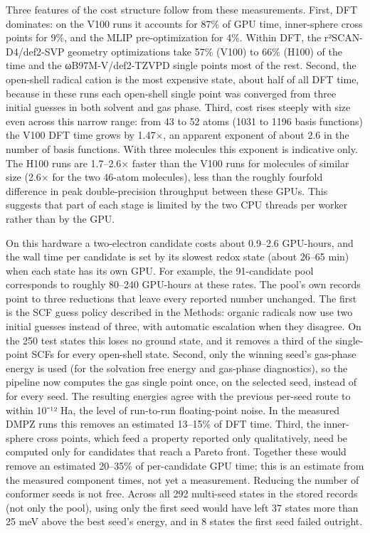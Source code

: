 \documentclass[journal=jcisd8,manuscript=article]{achemso}
\begin{document}
Three features of the cost structure follow from these measurements. First, DFT dominates: on the V100 runs it accounts for 87\% of GPU time, inner-sphere cross points for 9\%, and the MLIP pre-optimization for 4\%. Within DFT, the r²SCAN-D4/def2-SVP geometry optimizations take 57\% (V100) to 66\% (H100) of the time and the ωB97M-V/def2-TZVPD single points most of the rest. Second, the open-shell radical cation is the most expensive state, about half of all DFT time, because in these runs each open-shell single point was converged from three initial guesses in both solvent and gas phase. Third, cost rises steeply with size even across this narrow range: from 43 to 52 atoms (1031 to 1196 basis functions) the V100 DFT time grows by 1.47×, an apparent exponent of about 2.6 in the number of basis functions. With three molecules this exponent is indicative only. The H100 runs are 1.7–2.6× faster than the V100 runs for molecules of similar size (2.6× for the two 46-atom molecules), less than the roughly fourfold difference in peak double-precision throughput between these GPUs. This suggests that part of each stage is limited by the two CPU threads per worker rather than by the GPU.

On this hardware a two-electron candidate costs about 0.9–2.6 GPU-hours, and the wall time per candidate is set by its slowest redox state (about 26–65 min) when each state has its own GPU. For example, the 91-candidate pool corresponds to roughly 80–240 GPU-hours at these rates. The pool's own records point to three reductions that leave every reported number unchanged. The first is the SCF guess policy described in the Methods: organic radicals now use two initial guesses instead of three, with automatic escalation when they disagree. On the 250 test states this loses no ground state, and it removes a third of the single-point SCFs for every open-shell state. Second, only the winning seed's gas-phase energy is used (for the solvation free energy and gas-phase diagnostics), so the pipeline now computes the gas single point once, on the selected seed, instead of for every seed. The resulting energies agree with the previous per-seed route to within 10⁻¹² Ha, the level of run-to-run floating-point noise. In the measured DMPZ runs this removes an estimated 13–15\% of DFT time. Third, the inner-sphere cross points, which feed a property reported only qualitatively, need be computed only for candidates that reach a Pareto front. Together these would remove an estimated 20–35\% of per-candidate GPU time; this is an estimate from the measured component times, not yet a measurement. Reducing the number of conformer seeds is not free. Across all 292 multi-seed states in the stored records (not only the pool), using only the first seed would have left 37 states more than 25 meV above the best seed's energy, and in 8 states the first seed failed outright.
\end{document}
